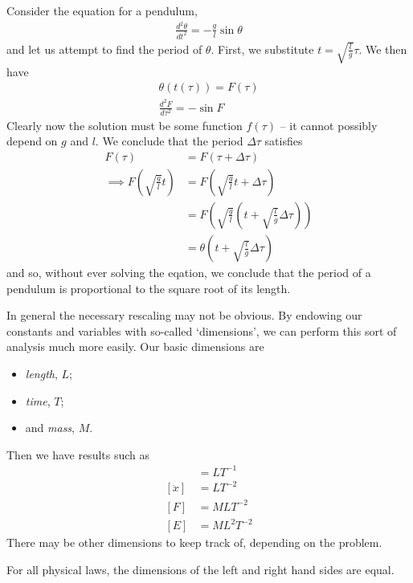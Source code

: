 \documentclass{../template/note}
\begin{document}
    Consider the equation for a pendulum,
    \begin{align*}
        \frac{d^2\theta}{dt^2} = -\frac g l \sin \theta
    \end{align*}
    and let us attempt to find the period of \(\theta\). First, we substitute \(t = \sqrt{\frac l g} \tau\). We then have
    \begin{align*}
        \theta(t(\tau)) = F(\tau) \\
        \frac{d^2F}{d\tau^2} = -\sin F
    \end{align*}
    Clearly now the solution must be some function \(f(\tau)\) -- it cannot possibly depend on \(g\) and \(l\). We conclude that the period \(\Delta \tau\) satisfies
    \begin{align*}
        F(\tau) &= F(\tau + \Delta \tau) \\
        \implies F\left(\sqrt{\frac g l} t\right) &= F\left(\sqrt{\frac g l} t + \Delta \tau\right) \\
        &= F\left(\sqrt{\frac g l}\left(t + \sqrt{\frac l g} \Delta \tau\right)\right) \\
        &= \theta\left(t + \sqrt{\frac l g }\Delta \tau\right)
    \end{align*}
    and so, without ever solving the eqation, we conclude that the period of a pendulum is proportional to the square root of its length.

    In general the necessary rescaling may not be obvious. By endowing our constants and variables with so-called `dimensions', we can perform this sort of analysis much more easily. Our basic dimensions are
    \begin{itemize}
        \item \emph{length}, \(L\);
        \item \emph{time}, \(T\);
        \item and \emph{mass}, \(M\).
    \end{itemize}
    Then we have results such as
    \begin{align*}
        [\dot x] &= \si{LT^{-1}} \\
        [\ddot x] &= \si{LT^{-2}} \\
        [F] &= \si{MLT^{-2}} \\
        [E] &= \si{ML^2T^{-2}}
    \end{align*}
    There may be other dimensions to keep track of, depending on the problem.

    \begin{theorem}
        For all physical laws, the dimensions of the left and right hand sides are equal.
    \end{theorem}
\end{document}
